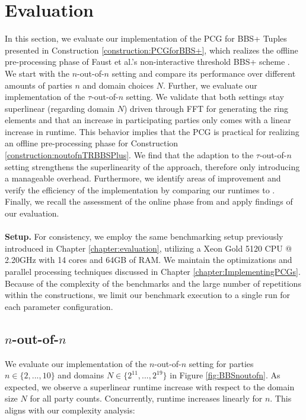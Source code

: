 \section{Evaluation}
In this section, we evaluate our implementation of the PCG for BBS+ Tuples presented in Construction \ref{construction:PCGforBBS+}, which realizes the offline pre-processing phase of Faust et al.'s non-interactive threshold BBS+ scheme \cite{cryptoeprint:2023/1076}. We start with the $n$-out-of-$n$ setting and compare its performance over different amounts of parties $n$ and domain choices $N$. Further, we evaluate our implementation of the $\tau$-out-of-$n$ setting. We validate that both settings stay superlinear (regarding domain $N$) driven through FFT for generating the ring elements and that an increase in participating parties only comes with a linear increase in runtime. This behavior implies that the PCG is practical for realizing an offline pre-processing phase for Construction \ref{construction:noutofnTRBBSPlus}. We find that the adaption to the $\tau$-out-of-$n$ setting strengthens the superlinearity of the approach, therefore only introducing a manageable overhead. Furthermore, we identify areas of improvement and verify the efficiency of the implementation by comparing our runtimes to \cite{abram2022low}. Finally, we recall the assessment of the online phase from \cite{cryptoeprint:2023/1076} and apply findings of our evaluation.
\\\\
\textbf{Setup.} For consistency, we employ the same benchmarking setup previously introduced in Chapter \ref{chapter:evaluation}, utilizing a Xeon Gold 5120 CPU @ 2.20GHz with 14 cores and 64GB of RAM. We maintain the optimizations and parallel processing techniques discussed in Chapter \ref{chapter:ImplementingPCGs}. Because of the complexity of the benchmarks and the large number of repetitions within the constructions, we limit our benchmark execution to a single run for each parameter configuration.

\subsection{$n$-out-of-$n$}
We evaluate our implementation of the $n$-out-of-$n$ setting for parties $n\in \{2, ..., 10\}$ and domains $N\in \{2^{11}, ...,2^{19}\}$ in Figure \ref{fig:BBSnoutofn}. As expected, we observe a superlinear runtime increase with respect to the domain size $N$ for all party counts. Concurrently, runtime increases linearly for $n$. This aligns with our complexity analysis:


